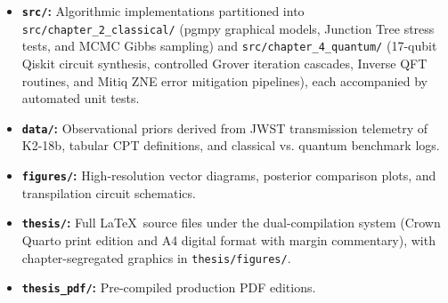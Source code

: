 \begin{itemize}
    \item \textbf{\texttt{src/}:} Algorithmic implementations partitioned into \texttt{src/chapter\_2\_classical/} (pgmpy graphical models, Junction Tree stress tests, and MCMC Gibbs sampling) and \texttt{src/chapter\_4\_quantum/} (17-qubit Qiskit circuit synthesis, controlled Grover iteration cascades, Inverse QFT routines, and Mitiq ZNE error mitigation pipelines), each accompanied by automated unit tests.
    \item \textbf{\texttt{data/}:} Observational priors derived from JWST transmission telemetry of K2-18b, tabular CPT definitions, and classical vs. quantum benchmark logs.
    \item \textbf{\texttt{figures/}:} High-resolution vector diagrams, posterior comparison plots, and transpilation circuit schematics.
    \item \textbf{\texttt{thesis/}:} Full \LaTeX\ source files under the dual-compilation system (Crown Quarto print edition and A4 digital format with margin commentary), with chapter-segregated graphics in \texttt{thesis/figures/}.
    \item \textbf{\texttt{thesis\_pdf/}:} Pre-compiled production PDF editions.
\end{itemize}
